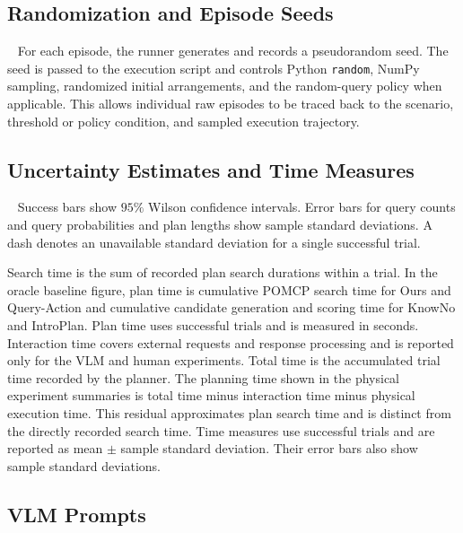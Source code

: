 \subsection{Randomization and Episode Seeds}~\label{appx:randomization}
For each episode, the runner generates and records a pseudorandom seed. The seed is passed to the execution script and controls Python \texttt{random}, NumPy sampling, randomized initial arrangements, and the random-query policy when applicable. This allows individual raw episodes to be traced back to the scenario, threshold or policy condition, and sampled execution trajectory.

\subsection{Uncertainty Estimates and Time Measures}~\label{appx:metric_details}
Success bars show $95\%$ Wilson confidence intervals. Error bars for query counts and query probabilities and plan lengths show sample standard deviations. A dash denotes an unavailable standard deviation for a single successful trial.

Search time is the sum of recorded plan search durations within a trial. In the oracle baseline figure, plan time is cumulative POMCP search time for Ours and Query-Action and cumulative candidate generation and scoring time for KnowNo and IntroPlan. Plan time uses successful trials and is measured in seconds. Interaction time covers external requests and response processing and is reported only for the VLM and human experiments. Total time is the accumulated trial time recorded by the planner. The planning time shown in the physical experiment summaries is total time minus interaction time minus physical execution time. This residual approximates plan search time and is distinct from the directly recorded search time. Time measures use successful trials and are reported as mean $\pm$ sample standard deviation. Their error bars also show sample standard deviations.

\subsection{VLM Prompts}~\label{appx:vlm_prompts}

